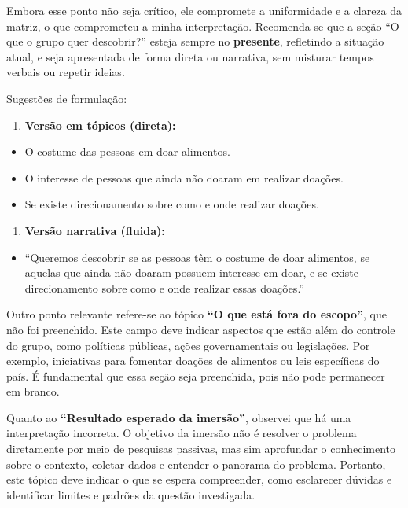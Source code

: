 \documentclass[
  sigconf,
  nonacm, %
  language=portuguese
]{acmart}
\begin{document}
Embora esse ponto não seja crítico, ele compromete a uniformidade e a clareza da matriz, o que comprometeu a minha interpretação. Recomenda-se que a seção “O que o grupo quer descobrir?” esteja sempre no \textbf{presente}, refletindo a situação atual, e seja apresentada de forma direta ou narrativa, sem misturar tempos verbais ou repetir ideias.

Sugestões de formulação:

\begin{enumerate}[leftmargin=14pt,itemsep=2pt,topsep=4pt]
  \item \textbf{Versão em tópicos (direta):}
\end{enumerate}

\begin{itemize}[leftmargin=14pt,itemsep=2pt,topsep=4pt]
  \item O costume das pessoas em doar alimentos.
  \item O interesse de pessoas que ainda não doaram em realizar doações.
  \item Se existe direcionamento sobre como e onde realizar doações.
\end{itemize}

\begin{enumerate}[leftmargin=14pt,itemsep=2pt,topsep=4pt]
  \item \textbf{Versão narrativa (fluida):}
\end{enumerate}

\begin{itemize}[leftmargin=14pt,itemsep=2pt,topsep=4pt]
  \item “Queremos descobrir se as pessoas têm o costume de doar alimentos, se aquelas que ainda não doaram possuem interesse em doar, e se existe direcionamento sobre como e onde realizar essas doações.”
\end{itemize}

Outro ponto relevante refere-se ao tópico \textbf{“O que está fora do escopo”}, que não foi preenchido. Este campo deve indicar aspectos que estão além do controle do grupo, como políticas públicas, ações governamentais ou legislações. Por exemplo, iniciativas para fomentar doações de alimentos ou leis específicas do país. É fundamental que essa seção seja preenchida, pois não pode permanecer em branco.

Quanto ao \textbf{“Resultado esperado da imersão”}, observei que há uma interpretação incorreta. O objetivo da imersão não é resolver o problema diretamente por meio de pesquisas passivas, mas sim aprofundar o conhecimento sobre o contexto, coletar dados e entender o panorama do problema. Portanto, este tópico deve indicar o que se espera compreender, como esclarecer dúvidas e identificar limites e padrões da questão investigada.
\end{document}
